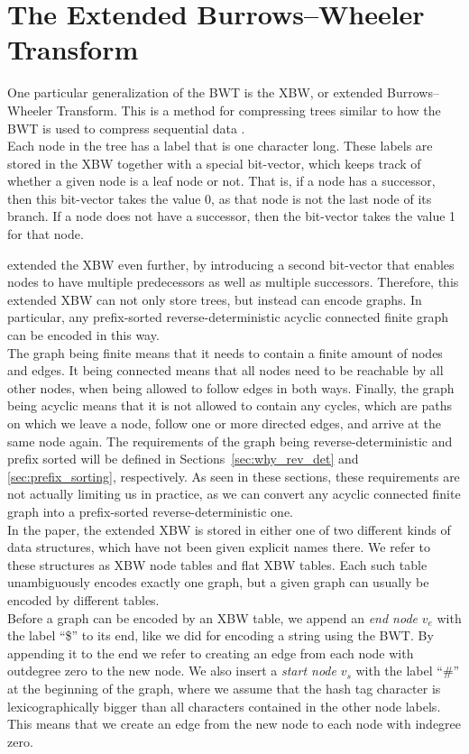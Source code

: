 \documentclass[a4paper,12pt,twoside,BCOR=10mm]{scrbook}
\begin{document}
\section{The Extended Burrows--Wheeler Transform}

One particular generalization of the BWT is the XBW, or extended Burrows--Wheeler Transform.
This is a method for compressing trees similar to how the
BWT is used to compress sequential data \citep{Ferragina2009}. \\
Each node in the tree has a label that is one character long.
These labels are stored in the XBW together with a special bit-vector,
which keeps track of whether a given node is a leaf node or not.
That is, if a node has a successor, then this bit-vector takes the value 0, as that node is not the last node
of its branch. If a node does not have a successor, then the bit-vector takes the value 1 for that node.

\citet{Siren2014} extended the XBW even further, by introducing a second bit-vector that enables nodes
to have multiple predecessors as well as multiple successors. Therefore, this extended XBW can not only
store trees, but instead can encode graphs.
In particular, any prefix-sorted reverse-deterministic
acyclic connected finite graph can be encoded in this way. \\
The graph being finite means that
it needs to contain a finite amount of nodes and edges. It being connected means that all
nodes need to be reachable by all other nodes, when being allowed to follow edges in both ways.
Finally, the graph being acyclic means that it is
not allowed to contain any cycles, which are paths on which we leave a node, follow one
or more directed edges, and arrive at the same node again.
The requirements of the graph being reverse-deterministic and prefix sorted
will be defined in Sections~\ref{sec:why_rev_det} and \ref{sec:prefix_sorting}, respectively.
As seen in these sections,
these requirements are not actually limiting us in practice,
as we can convert any acyclic connected finite graph
into a prefix-sorted reverse-deterministic one. \\
In the paper, the extended XBW is stored in either one of two different kinds of data structures,
which have not been given explicit names there. We refer to these structures as
XBW node tables and flat XBW tables.
Each such table unambiguously encodes exactly one graph, but a given graph
can usually be encoded by different tables. \\
Before a graph can be encoded by an XBW table, we append an \textit{end node} $ v_e $ with the label “\$”
to its end,
like we did for encoding a string using the BWT.
By appending it to the end we refer to creating an edge from each node with outdegree zero to the new node.
We also insert a \textit{start node} $ v_s $ with the label “$\#$” at the beginning of the graph,
where we assume that the hash tag character is lexicographically bigger
than all characters contained in the other node labels.
This means that we create an edge from the new node to each node with indegree zero.
\end{document}
